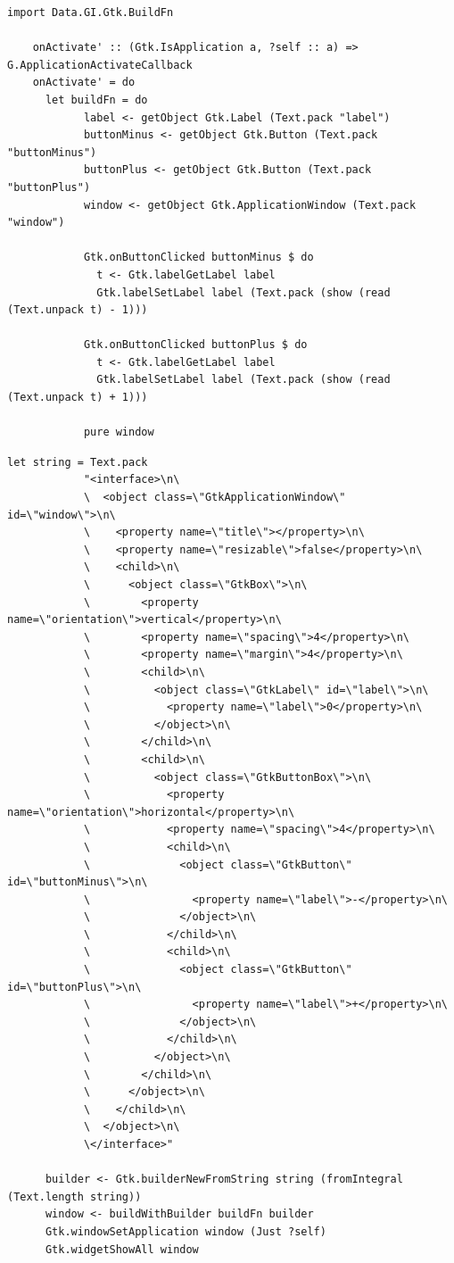 \documentclass[UdineBachThesis,american,11pt]{PhdThesis}
\begin{document}
  \begin{Verbatim}[gobble=4,fontsize=\small]
    import Data.GI.Gtk.BuildFn

    onActivate' :: (Gtk.IsApplication a, ?self :: a) => G.ApplicationActivateCallback
    onActivate' = do
      let buildFn = do
            label <- getObject Gtk.Label (Text.pack "label")
            buttonMinus <- getObject Gtk.Button (Text.pack "buttonMinus")
            buttonPlus <- getObject Gtk.Button (Text.pack "buttonPlus")
            window <- getObject Gtk.ApplicationWindow (Text.pack "window")

            Gtk.onButtonClicked buttonMinus $ do
              t <- Gtk.labelGetLabel label
              Gtk.labelSetLabel label (Text.pack (show (read (Text.unpack t) - 1)))

            Gtk.onButtonClicked buttonPlus $ do
              t <- Gtk.labelGetLabel label
              Gtk.labelSetLabel label (Text.pack (show (read (Text.unpack t) + 1)))

            pure window
  \end{Verbatim}

  \pagebreak

  \begin{Verbatim}[gobble=4,fontsize=\small]
      let string = Text.pack
            "<interface>\n\
            \  <object class=\"GtkApplicationWindow\" id=\"window\">\n\
            \    <property name=\"title\"></property>\n\
            \    <property name=\"resizable\">false</property>\n\
            \    <child>\n\
            \      <object class=\"GtkBox\">\n\
            \        <property name=\"orientation\">vertical</property>\n\
            \        <property name=\"spacing\">4</property>\n\
            \        <property name=\"margin\">4</property>\n\
            \        <child>\n\
            \          <object class=\"GtkLabel\" id=\"label\">\n\
            \            <property name=\"label\">0</property>\n\
            \          </object>\n\
            \        </child>\n\
            \        <child>\n\
            \          <object class=\"GtkButtonBox\">\n\
            \            <property name=\"orientation\">horizontal</property>\n\
            \            <property name=\"spacing\">4</property>\n\
            \            <child>\n\
            \              <object class=\"GtkButton\" id=\"buttonMinus\">\n\
            \                <property name=\"label\">-</property>\n\
            \              </object>\n\
            \            </child>\n\
            \            <child>\n\
            \              <object class=\"GtkButton\" id=\"buttonPlus\">\n\
            \                <property name=\"label\">+</property>\n\
            \              </object>\n\
            \            </child>\n\
            \          </object>\n\
            \        </child>\n\
            \      </object>\n\
            \    </child>\n\
            \  </object>\n\
            \</interface>"

      builder <- Gtk.builderNewFromString string (fromIntegral (Text.length string))
      window <- buildWithBuilder buildFn builder
      Gtk.windowSetApplication window (Just ?self)
      Gtk.widgetShowAll window
  \end{Verbatim}
\end{document}
